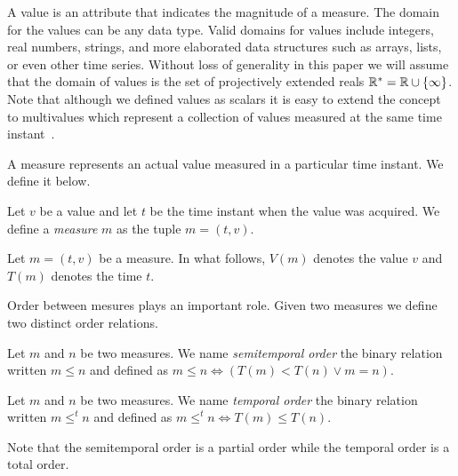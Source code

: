 A value is an attribute that indicates the magnitude of a measure. The
domain for the values can be any data type. Valid domains for values
include integers, real numbers, strings, and more elaborated data
structures such as arrays, lists, or even other time series. Without
loss of generality in this paper we will assume that the domain of
values is the set of projectively extended reals $\mathbb{R}^{*} = \mathbb{R} \cup
\{\infty\}$.
%
%
Note that although we defined values as scalars it is easy to extend
the concept to multivalues which represent a collection of values
measured at the same time instant~\cite{assfalg08:thesis}.


A measure represents an actual value measured in a particular time
instant. We define it below.
\begin{definition}
  Let $v$ be a value and let $t$ be the time instant when the value
  was acquired. We define a \emph{measure} $m$ as the tuple $m=(t,v)$.
\end{definition}

Let $m = (t,v)$ be a measure. In what follows, $V(m)$ denotes the
value $v$ and $T(m)$ denotes the time $t$.

Order between mesures plays an important role. Given two measures we
define two distinct order relations.
%

\begin{definition}
  Let $m$ and $n$ be two measures. We name \emph{semitemporal order}
  the binary relation written $m\leq n$ and defined as $m\leq n\iff
  (T(m)<T(n) \vee m=n)$.
\end{definition}

\begin{definition} Let $m$ and $n$ be two measures. We
    name \emph{temporal order} the binary relation written $m \leq^t
    n$ and defined as $m \leq^t n \iff T(m) \leq T(n)$.
\end{definition}

Note that the semitemporal order is a partial order while the temporal
order is a total order.

